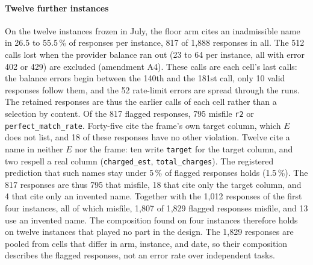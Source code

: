 \documentclass[10pt,twocolumn]{article}
\begin{document}
\paragraph{Twelve further instances}
On the twelve instances frozen in July, the floor arm cites an inadmissible
name in 26.5 to 55.5\,\% of responses per instance, 817 of 1{,}888 responses
in all. The 512 calls lost when the provider balance ran out (23 to 64 per
instance, all with error 402 or 429) are excluded (amendment A4). These calls
are each cell's last calls: the balance errors begin between the 140th and
the 181st call, only 10 valid responses follow them, and the 52 rate-limit
errors are spread through the runs. The retained responses are thus the
earlier calls of each cell rather than a selection by content. Of the 817
flagged responses, 795 misfile \texttt{r2} or \texttt{perfect\_match\_rate}.
Forty-five cite the frame's own target column, which $E$ does not list, and 18
of these responses have no other violation. Twelve cite a name in neither $E$
nor the frame: ten write \texttt{target} for the target column, and two
respell a real column (\texttt{charged\_est}, \texttt{total\_charges}). The
registered prediction that such names stay under 5\,\% of flagged responses
holds (1.5\,\%). The 817 responses are thus 795 that misfile, 18 that cite
only the target column, and 4 that cite only an invented name. Together with
the 1{,}012 responses of the first four instances, all of which misfile,
1{,}807 of 1{,}829 flagged responses misfile, and 13 use an invented name. The
composition found on four instances therefore holds on twelve instances that
played no part in the design. The 1{,}829 responses are pooled from cells that
differ in arm, instance, and date, so their composition describes the flagged
responses, not an error rate over independent tasks.
\end{document}
